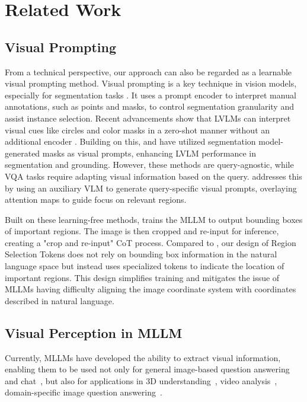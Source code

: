 \section{Related Work}

\subsection{Visual Prompting}
From a technical perspective, our approach can also be regarded as a learnable visual prompting method.
Visual prompting is a key technique in vision models, especially for segmentation tasks \cite{sam,vp_3,vp_2}. It uses a prompt encoder to interpret manual annotations, such as points and masks, to control segmentation granularity and assist instance selection. Recent advancements show that LVLMs can interpret visual cues like circles and color masks in a zero-shot manner without an additional encoder \cite{vp_clip_1,vp_clip_2}. 
Building on this, \cite{som} and \cite{fgvp} have utilized segmentation model-generated masks as visual prompts, enhancing LVLM performance in segmentation and grounding. However, these methods are query-agnostic, while VQA tasks require adapting visual information based on the query. \cite{yu2024api} addresses this by using an auxiliary VLM to generate query-specific visual prompts, overlaying attention maps to guide focus on relevant regions.

Built on these learning-free methods, \cite{shao2024visual} trains the MLLM to output bounding boxes of important regions. The image is then cropped and re-input for inference, creating a "crop and re-input" CoT process. Compared to \cite{shao2024visual}, our design of Region Selection Tokens does not rely on bounding box information in the natural language space but instead uses specialized tokens to indicate the location of important regions. This design simplifies training and mitigates the issue of MLLMs having difficulty aligning the image coordinate system with coordinates described in natural language.

\subsection{Visual Perception in MLLM}
Currently, MLLMs have developed the ability to extract visual information, enabling them to be used not only for general image-based question answering and chat~\cite{llava,llava15,cogvlm,gpt4v,gemini,Qwen2VL,Qwen-VL,ma2023llmpruner}, but also for applications in 3D understanding~\cite{hong20233dllminjecting3dworld,zhu2024llava,cvpr23_3dclr}, video analysis~\cite{damonlpsg2024videollama2,damonlpsg2023videollama,tang2024salmonn,sun2024videosalmonn}, domain-specific image question answering~\cite{li2023llavamed}.


